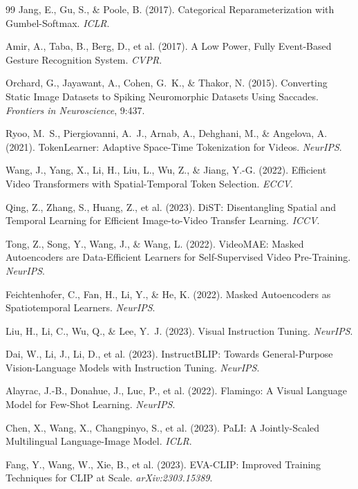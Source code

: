 \documentclass{article}
\begin{document}
{\begin{thebibliography}{99}
Jang, E., Gu, S., \& Poole, B. (2017). Categorical Reparameterization with Gumbel-Softmax. \emph{ICLR}.

Amir, A., Taba, B., Berg, D., et al. (2017). A Low Power, Fully Event-Based Gesture Recognition System. \emph{CVPR}.

Orchard, G., Jayawant, A., Cohen, G.~K., \& Thakor, N. (2015). Converting Static Image Datasets to Spiking Neuromorphic Datasets Using Saccades. \emph{Frontiers in Neuroscience}, 9:437.

Ryoo, M.~S., Piergiovanni, A.~J., Arnab, A., Dehghani, M., \& Angelova, A. (2021). TokenLearner: Adaptive Space-Time Tokenization for Videos. \emph{NeurIPS}.

Wang, J., Yang, X., Li, H., Liu, L., Wu, Z., \& Jiang, Y.-G. (2022). Efficient Video Transformers with Spatial-Temporal Token Selection. \emph{ECCV}.

Qing, Z., Zhang, S., Huang, Z., et al. (2023). DiST: Disentangling Spatial and Temporal Learning for Efficient Image-to-Video Transfer Learning. \emph{ICCV}.

Tong, Z., Song, Y., Wang, J., \& Wang, L. (2022). VideoMAE: Masked Autoencoders are Data-Efficient Learners for Self-Supervised Video Pre-Training. \emph{NeurIPS}.

Feichtenhofer, C., Fan, H., Li, Y., \& He, K. (2022). Masked Autoencoders as Spatiotemporal Learners. \emph{NeurIPS}.

Liu, H., Li, C., Wu, Q., \& Lee, Y.~J. (2023). Visual Instruction Tuning. \emph{NeurIPS}.

Dai, W., Li, J., Li, D., et al. (2023). InstructBLIP: Towards General-Purpose Vision-Language Models with Instruction Tuning. \emph{NeurIPS}.

Alayrac, J.-B., Donahue, J., Luc, P., et al. (2022). Flamingo: A Visual Language Model for Few-Shot Learning. \emph{NeurIPS}.

Chen, X., Wang, X., Changpinyo, S., et al. (2023). PaLI: A Jointly-Scaled Multilingual Language-Image Model. \emph{ICLR}.

Fang, Y., Wang, W., Xie, B., et al. (2023). EVA-CLIP: Improved Training Techniques for CLIP at Scale. \emph{arXiv:2303.15389}.


\end{thebibliography}}
\end{document}
